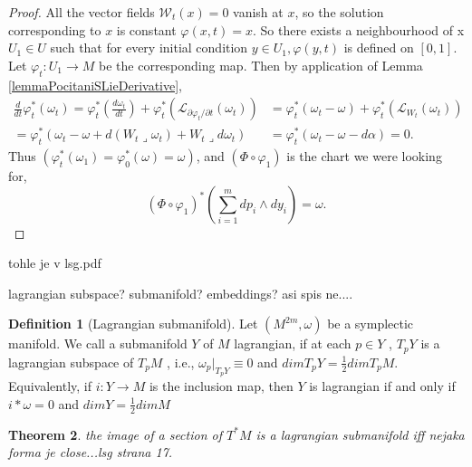 \documentclass{article}
\newtheorem{theorem}{Theorem}
\theoremstyle{definition}
\newtheorem{definition}[theorem]{Definition}
\begin{document}
\begin{proof}
    All the vector fields $\mathcal{W}_t(x) = 0$ vanish at $x$, so the solution corresponding to $x$ is constant $\varphi(x,t) = x$. So there exists a neighbourhood of x $U_1 \in U$ such that for every initial condition $y \in U_1, \varphi(y,t)$ is defined on $[0,1]$. Let $\varphi_t:U_1 \rightarrow M$ be the corresponding map. Then by application of Lemma \ref{lemmaPocitaniSLieDerivative},
    \begin{equation*}
        \begin{split}
            \frac{d}{dt} \varphi_t^* (\omega_t) = \varphi_t^* \left( \frac{d\omega_t}{dt} \right) 
            + \varphi_t^* \left( \mathcal{L}_{\partial \varphi_t / \partial t} (\omega_t) \right)
            &= \varphi_t^* (\omega_t - \omega) + \varphi_t^* \left( \mathcal{L}_{W_t} (\omega_t) \right) \\ 
            = \varphi_t^* (\omega_t - \omega + d(W_t \lrcorner \omega_t) + W_t \lrcorner d\omega_t) 
            &= \varphi_t^* (\omega_t - \omega - d\alpha) = 0.
        \end{split}
    \end{equation*}
    Thus $(\varphi_t^*(\omega_1) = \varphi_0^*(\omega) = \omega)$, and $(\Phi \circ \varphi_1)$ is the chart we were looking for,
    \begin{equation*}
        (\Phi \circ \varphi_1)^* \left( \sum_{i=1}^m dp_i \wedge dy_i \right) = \omega.
    \end{equation*}

\end{proof}

tohle je v lsg.pdf

lagrangian subspace? submanifold? embeddings? asi spis ne....

\begin{definition}[Lagrangian submanifold]
    Let $(M^{2m},\omega)$ be a symplectic manifold. We call a submanifold $Y$ of $M$ lagrangian, if at each $p \in Y$ , $T_pY$ is a lagrangian
    subspace of $T_pM$ , i.e., $\omega_p|_{T_pY} \equiv 0$ and $dim T_pY = \frac{1}{2} dim T_pM$. 
    Equivalently, if $i : Y \rightarrow M$ is the inclusion map, then $Y$ is lagrangian if and only if $i*\omega = 0$ and $dim Y = \frac{1}{2} dim M$ 
    
\end{definition}


\begin{theorem}
    the image of a section of $T^*M$ is a lagrangian submanifold iff nejaka forma je close...lsg strana 17.
\end{theorem}
\end{document}
